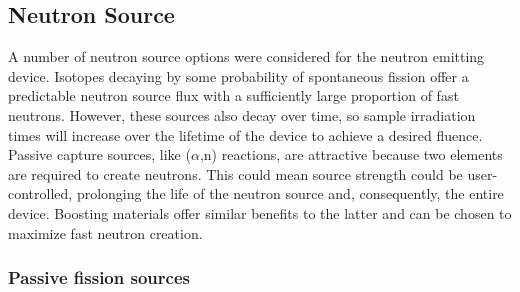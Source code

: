 \documentclass{mc2015}
\begin{document}
\subsection{Neutron Source}
\label{sec:sources}

A number of neutron source options were considered for the neutron emitting device. Isotopes decaying by some probability of spontaneous fission offer a predictable neutron source flux with a sufficiently large proportion of fast neutrons. However, these sources also decay over time, so sample irradiation times will increase over the lifetime of the device to achieve a desired fluence. Passive capture sources, like ($\alpha$,n) reactions, are attractive because two elements are required to create neutrons. This could mean source strength could be user-controlled, prolonging the life of the neutron source and, consequently, the entire device. Boosting materials offer similar benefits to the latter and can be chosen to maximize fast neutron creation.  


\subsubsection{Passive fission sources}
\end{document}
